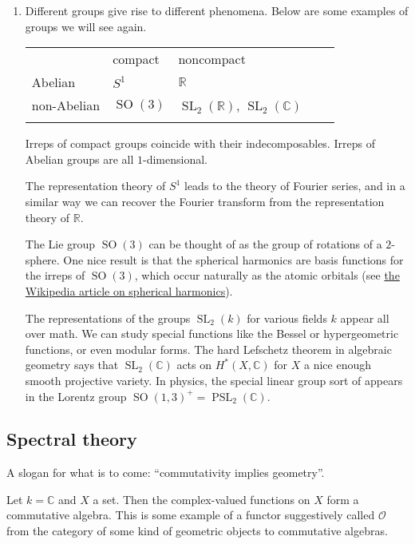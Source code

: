 \documentclass[11pt,leqno]{article}
\theoremstyle{plain}
\theoremstyle{definition}
\numberwithin{equation}{section}
\numberwithin{lem}{section}
\DeclareMathOperator{\SO}{SO}
\DeclareMathOperator{\SL}{SL}
\DeclareMathOperator{\PSL}{PSL}
\begin{document}
\begin{enumerate}
    \item Different groups give rise to different phenomena. Below are some examples of groups we will see again.
    \begin{table}[H]
\centering
\begin{tabular}{lllll}
\multicolumn{1}{l|}{}        & \multicolumn{1}{l|}{compact} & noncompact  &  &  \\ \cline{1-3}
\multicolumn{1}{l|}{Abelian} & \multicolumn{1}{l|}{$S^1$}   & $\mathbb R$ &  &  \\ \cline{1-3}
\multicolumn{1}{l|}{non-Abelian} & \multicolumn{1}{l|}{$\SO(3)$} & $\SL_2(\mathbb R)$, $\SL_2(\mathbb C)$ &  &  \\
                             &                              &             &  & 
\end{tabular}
\end{table}
    
    Irreps of compact groups coincide with their indecomposables. Irreps of Abelian groups are all $1$-dimensional.
    
    The representation theory of $S^1$ leads to the theory of Fourier series, and in a similar way we can recover the Fourier transform from the representation theory of $\mathbb R$.

    The Lie group $\SO(3)$ can be thought of as the group of rotations of a $2$-sphere. One nice result is that the spherical harmonics are basis functions for the irreps of $\SO(3)$, which occur naturally as the atomic orbitals (see \href{https://en.wikipedia.org/wiki/Spherical_harmonics}{the Wikipedia article on spherical harmonics}).

    The representations of the groups $\SL_2(k)$ for various fields $k$ appear all over math.  We can study special functions like the Bessel or hypergeometric functions, or even modular forms. The hard Lefschetz theorem in algebraic geometry says that $\SL_2(\mathbb C)$ acts on $H^\ast(X,\mathbb C)$ for $X$ a nice enough smooth projective variety. In physics, the special linear group sort of appears in the Lorentz group $\SO(1,3)^+ = \PSL_2(\mathbb C)$.
\end{enumerate}

\subsection{Spectral theory}
A slogan for what is to come: ``commutativity implies geometry''.

Let $k = \mathbb C$ and $X$ a set. Then the complex-valued functions on $X$ form a commutative algebra. This is some example of a functor suggestively called $\mathcal O$ from the category of some kind of geometric objects to commutative algebras.
\end{document}
